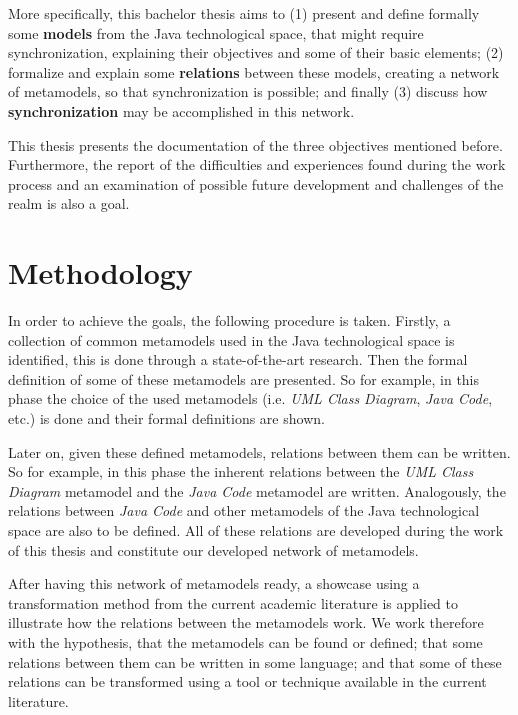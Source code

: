 \documentclass[tuberlin,cic,tc,english,noabntcite, oneside]{iiufrgs}
\begin{document}
More specifically, this bachelor thesis aims to (1) present and define formally some \textbf{models} from the Java technological space, that might require synchronization, explaining their objectives and some of their basic elements; (2) formalize and explain some  \textbf{relations} between these models, creating a network of metamodels, so that synchronization is possible; and finally (3) discuss how \textbf{synchronization} may be accomplished in this network.

This thesis presents the documentation of the three objectives mentioned before. Furthermore, the report of the difficulties and experiences found during the work process and an examination of possible future development and challenges of the realm is also a goal.

\section{Methodology}
In order to achieve the goals, the following procedure is taken. Firstly, a collection of common metamodels used in the Java technological space is identified, this is done through a state-of-the-art research. Then the formal definition of some of these metamodels are presented. So for example, in this phase the choice of the used metamodels (i.e. \emph{UML Class Diagram}, \emph{Java Code}, etc.) is done and their formal definitions are shown.

Later on, given these defined metamodels, relations between them can be written. So for example, in this phase the inherent relations between the \emph{UML Class Diagram} metamodel and the \emph{Java Code} metamodel are written. Analogously, the relations between \emph{Java Code} and other metamodels of the Java technological space are also to be defined. All of these relations are developed during the work of this thesis and constitute our developed network of metamodels.

After having this network of metamodels ready, a showcase using a transformation method from the current academic literature is applied to illustrate how the relations between the metamodels work. We work therefore with the hypothesis, that the metamodels can be found or defined; that some relations between them can be written in some language; and that some of these relations can be transformed using a tool or technique available in the current literature.
\end{document}
